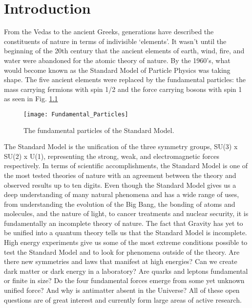 \chapter{Introduction} \label{ch:introduction}

From the Vedas to the ancient Greeks, generations have described the constituents of nature in terms of indivisible `elements'.  It wasn't until the beginning of the 20th century that the ancient elements of earth, wind, fire, and water were abandoned for the atomic theory of nature.  By the 1960's, what would become known as the Standard Model of Particle Physics was taking shape.  The five ancient elements were replaced by the fundamental particles: the mass carrying fermions with spin 1/2 and the force carrying bosons with spin 1 as seen in Fig. \ref{fig:fundpart}
\begin{figure}[h]
\texttt{[image: Fundamental\_Particles]}
\centering
\caption{The fundamental particles of the Standard Model\cite{Patrignani:2016xqp}.}
\label{fig:fundpart}
\end{figure}
\par
The Standard Model is the unification of the three symmetry groups, SU(3) x SU(2) x U(1), representing the strong, weak, and electromagnetic forces respectively\cite{Langacker:2009my}.  In terms of scientific accomplishments, the Standard Model is one of the most tested theories of nature with an agreement between the theory and observed results up to ten digits\cite{Aoyama:2014sxa}.  Even though the Standard Model gives us a deep understanding of many natural phenomena and has a wide range of uses, from understanding the evolution of the Big Bang, the bonding of atoms and molecules, and the nature of light, to cancer treatments and nuclear security, it is fundamentally an incomplete theory of nature.  The fact that Gravity has yet to be unified into a quantum theory tells us that the Standard Model is incomplete.  High energy experiments give us some of the most extreme conditions possible to test the Standard Model and to look for phenomena outside of the theory.  Are there new symmetries and laws that manifest at high energies? Can we create dark matter or dark energy in a laboratory?  Are quarks and leptons fundamental or finite in size?  Do the four fundamental forces emerge from some yet unknown unified force?  And why is antimatter absent in the Universe?  All of these open questions are of great interest and currently form large areas of active research.  


